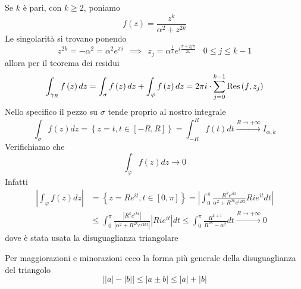 Se $k$ è pari, con $k\geqslant 2$, poniamo
\begin{equation*}
f\left(z\right) = \frac{z^{k}}{\alpha ^{2} + z^{2k}}
\end{equation*}
Le singolarità si trovano ponendo
\begin{equation*}
z^{2k} = - \alpha ^{2} = \alpha ^{2} e^{\pi i} \ \ \implies \ \ z_{j} = \alpha ^{\frac{1}{k}} e^{i\frac{\pi + 2j\pi }{2k}} \ \ \ \ 0\leqslant j\leqslant k - 1
\end{equation*}
allora per il teorema dei residui
\begin{equation*}
\int _{\gamma _{R}} f\left(z\right) dz = \int _{\sigma } f\left(z\right) dz + \int _{\varphi } f\left(z\right) dz = 2\pi i\cdot \sum\limits ^{k - 1}_{j = 0}\operatorname{Res} \left(f,z_{j}\right)
\end{equation*}
Nello specifico il pezzo su $\sigma $ tende proprio al nostro integrale
\begin{equation*}
\int _{\sigma } f\left(z\right) dz = \left\{z = t,t\in \left[ - R,R\right]\right\} = \int ^{R}_{ - R} f\left(t\right) dt\xrightarrow{R\rightarrow + \infty } I_{\alpha ,k}
\end{equation*}
Verifichiamo che
\begin{equation*}
\int _{\varphi } f\left(z\right) dz\rightarrow 0
\end{equation*}
Infatti
\begin{align*}
\left| \int _{\varphi } f\left(z\right) dz\right|  & = \left\{z = Re^{it} ,t\in \left[ 0,\pi \right]\right\} = \left| \int ^{\pi }_{0}\frac{R^{k} e^{ikt}}{\alpha ^{2} + R^{2k} e^{i2kt}} Rie^{it} dt\right| \\
 & \leqslant \int ^{\pi }_{0}\frac{\left| R^{k} e^{ikt}\right| }{\left| \alpha ^{2} + R^{2k} e^{i2kt}\right| }\left| Rie^{it}\right| dt\leqslant \int ^{\pi }_{0}\frac{R^{k + 1}}{R^{2k} - \alpha ^{2}} dt\xrightarrow{R\rightarrow + \infty } 0
\end{align*}
dove è stata usata la disuguaglianza triangolare
\begin{rem}
 Per maggiorazioni e minorazioni ecco la forma più generale della disuguaglianza del triangolo
\begin{equation*}
\left| \left| a\right| - \left| b\right| \right| \leqslant \left| a\pm b\right| \leqslant \left| a\right| + \left| b\right| 
\end{equation*}
\end{rem}

